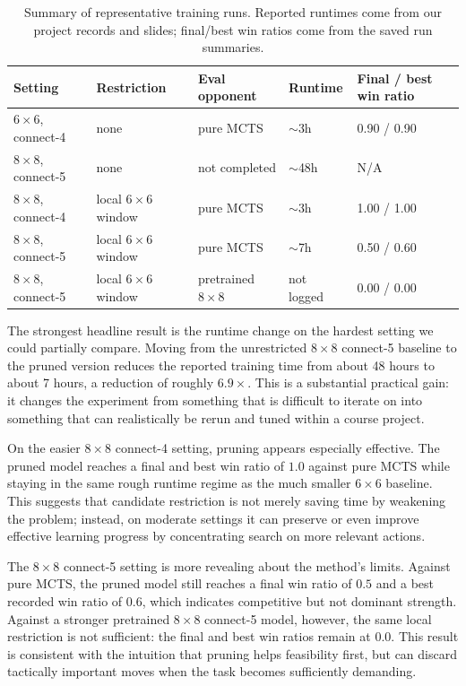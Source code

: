 \documentclass{article}
\begin{document}
\begin{table}[t]
  \caption{Summary of representative training runs. Reported runtimes come from our project records and slides; final/best win ratios come from the saved run summaries.}
  \label{tab:main-results}
  \centering
  \begin{tabular}{lllll}
    \toprule
    Setting & Restriction & Eval opponent & Runtime & Final / best win ratio \\
    \midrule
    \(6 \times 6\), connect-4 & none & pure MCTS & \(\sim\)3h & 0.90 / 0.90 \\
    \(8 \times 8\), connect-5 & none & not completed & \(\sim\)48h & N/A \\
    \(8 \times 8\), connect-4 & local \(6 \times 6\) window & pure MCTS & \(\sim\)3h & 1.00 / 1.00 \\
    \(8 \times 8\), connect-5 & local \(6 \times 6\) window & pure MCTS & \(\sim\)7h & 0.50 / 0.60 \\
    \(8 \times 8\), connect-5 & local \(6 \times 6\) window & pretrained \(8 \times 8\) & not logged & 0.00 / 0.00 \\
    \bottomrule
  \end{tabular}
\end{table}

The strongest headline result is the runtime change on the hardest setting we could partially compare. Moving from the unrestricted \(8 \times 8\) connect-5 baseline to the pruned version reduces the reported training time from about 48 hours to about 7 hours, a reduction of roughly \(6.9\times\). This is a substantial practical gain: it changes the experiment from something that is difficult to iterate on into something that can realistically be rerun and tuned within a course project.

On the easier \(8 \times 8\) connect-4 setting, pruning appears especially effective. The pruned model reaches a final and best win ratio of \(1.0\) against pure MCTS while staying in the same rough runtime regime as the much smaller \(6 \times 6\) baseline. This suggests that candidate restriction is not merely saving time by weakening the problem; instead, on moderate settings it can preserve or even improve effective learning progress by concentrating search on more relevant actions.

The \(8 \times 8\) connect-5 setting is more revealing about the method's limits. Against pure MCTS, the pruned model still reaches a final win ratio of \(0.5\) and a best recorded win ratio of \(0.6\), which indicates competitive but not dominant strength. Against a stronger pretrained \(8 \times 8\) connect-5 model, however, the same local restriction is not sufficient: the final and best win ratios remain at \(0.0\). This result is consistent with the intuition that pruning helps feasibility first, but can discard tactically important moves when the task becomes sufficiently demanding.
\end{document}
